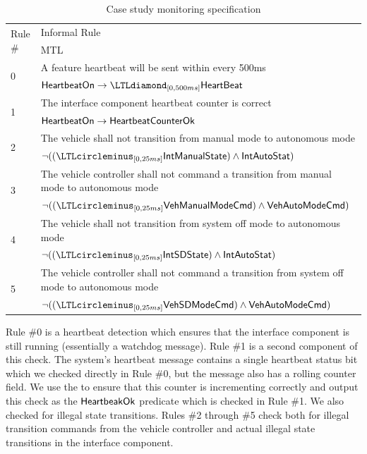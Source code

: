 \begin{table}[t]
\begin{tabular}{|l|p{4.5in}|}
\hline \multirow{2}{*}{Rule \#} & Informal Rule \\ & MTL \\
\hline \multirow{2}{*}{0} & A feature heartbeat will be sent within every 500ms \\
& $\pred{HeartbeatOn} \rightarrow \LTLdiamond_{[0,500ms]} \pred{HeartBeat}$ \\
\hline \multirow{2}{*}{1} & The interface component heartbeat counter is correct \\
& $\mathsf{HeartbeatOn} \rightarrow \mathsf{HeartbeatCounterOk}$ \\
\hline \multirow{2}{*}{2} & The vehicle shall not transition from manual mode to autonomous mode \\
&  $\neg ((\LTLcircleminus_{[0,25ms]} \pred{IntManualState}) \wedge \pred{IntAutoStat})$\\
\hline \multirow{2}{*}{3} & The vehicle controller shall not command a transition from manual mode to autonomous mode \\
& $\neg ((\LTLcircleminus_{[0,25ms]} \pred{VehManualModeCmd}) \wedge \pred{VehAutoModeCmd})$\\
\hline \multirow{2}{*}{4} & The vehicle shall not transition from system off mode to autonomous mode \\ 
&  $\neg ((\LTLcircleminus_{[0,25ms]} \pred{IntSDState}) \wedge \pred{IntAutoStat})$\\
\hline \multirow{2}{*}{5} & The vehicle controller shall not command a transition from system off mode to autonomous mode \\
& $\neg ((\LTLcircleminus_{[0,25ms]} \pred{VehSDModeCmd}) \wedge \pred{VehAutoModeCmd})$\\
\hline
\end{tabular}
\caption{Case study monitoring specification \label{tab:monspec}}
\end{table}

Rule \#0 is a heartbeat detection which ensures that the interface component is still running (essentially a watchdog message). Rule \#1 is a second component of this check. The system's heartbeat message contains a single heartbeat status bit which we checked directly in Rule \#0, but the message also has a rolling counter field. We use the \sfmap to ensure that this counter is incrementing correctly and output this check as the $\mathsf{HeartbeakOk}$ predicate which is checked in Rule \#1.
We also checked for illegal state transitions. Rules \#2 through \#5 check both for illegal transition commands from the vehicle controller and actual illegal state transitions in the interface component.


